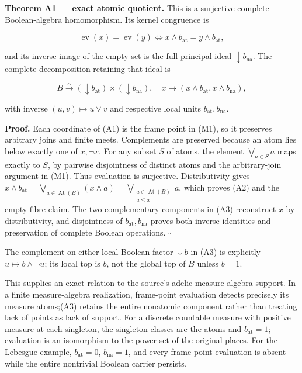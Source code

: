 \textbf{Theorem A1 --- exact atomic quotient.} This is a surjective complete Boolean-algebra homomorphism. Its kernel congruence is

\[
\operatorname{ev}(x)=\operatorname{ev}(y)
\iff x\wedge b_{\mathrm{at}}=y\wedge b_{\mathrm{at}},
\tag{A2}
\]

and its inverse image of the empty set is the full principal ideal \(\downarrow b_{\mathrm{na}}\). The complete decomposition retaining that ideal is

\[
B\xrightarrow{\sim}(\downarrow b_{\mathrm{at}})\times(\downarrow b_{\mathrm{na}}),
\quad x\mapsto(x\wedge b_{\mathrm{at}},x\wedge b_{\mathrm{na}}),
\tag{A3}
\]

with inverse \((u,v)\mapsto u\vee v\) and respective local units \(b_{\mathrm{at}},b_{\mathrm{na}}\).

\textbf{Proof.} Each coordinate of (A1) is the frame point in (M1), so it preserves arbitrary joins and finite meets. Complements are preserved because an atom lies below exactly one of \(x,\neg x\). For any subset \(S\) of atoms, the element \(\bigvee_{a\in S}a\) maps exactly to \(S\), by pairwise disjointness of distinct atoms and the arbitrary-join argument in (M1). Thus evaluation is surjective. Distributivity gives \(x\wedge b_{\mathrm{at}}=\bigvee_{a\in\operatorname{At}(B)}(x\wedge a)=\bigvee_{\substack{a\in\operatorname{At}(B)\\a\le x}}a\), which proves (A2) and the empty-fibre claim. The two complementary components in (A3) reconstruct \(x\) by distributivity, and disjointness of \(b_{\mathrm{at}},b_{\mathrm{na}}\) proves both inverse identities and preservation of complete Boolean operations. \(\square\)

The complement on either local Boolean factor \(\downarrow b\) in (A3) is explicitly \(u\mapsto b\wedge \neg u\); its local top is \(b\), not the global top of \(B\) unless \(b=1\).

This supplies an exact relation to the source's adelic measure-algebra support. In a finite measure-algebra realization, frame-point evaluation detects precisely its measure atoms;(A3) retains the entire nonatomic component rather than treating lack of points as lack of support. For a discrete countable measure with positive measure at each singleton, the singleton classes are the atoms and \(b_{\mathrm{at}}=1\); evaluation is an isomorphism to the power set of the original places. For the Lebesgue example, \(b_{\mathrm{at}}=0\), \(b_{\mathrm{na}}=1\), and every frame-point evaluation is absent while the entire nontrivial Boolean carrier persists.

